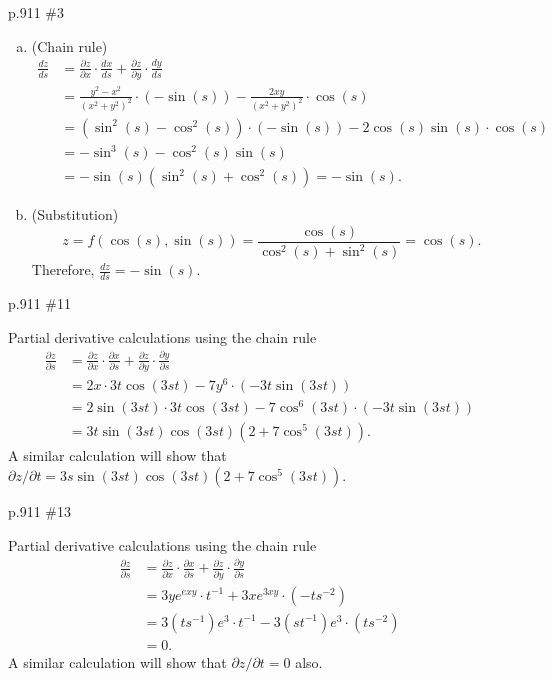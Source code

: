 \begin{practice}p.911 \#3\end{practice}
\begin{pracsol}
  \begin{enumerate}[(a)]
    \item (Chain rule)
    \[\begin{split}
      \frac{dz}{ds} &= \frac{\partial z}{\partial x}\cdot\frac{dx}{ds}+\frac{\partial z}{\partial y}\cdot\frac{dy}{ds}\\
      &= \frac{y^2-x^2}{(x^2+y^2)^2}\cdot(-\sin(s))-\frac{2xy}{(x^2+y^2)^2}\cdot\cos(s)\\
      &= (\sin^2(s)-\cos^2(s))\cdot(-\sin(s))-2\cos(s)\sin(s)\cdot\cos(s)\\
      &= -\sin^3(s)-\cos^2(s)\sin(s)\\
      &= -\sin(s)(\sin^2(s)+\cos^2(s))=-\sin(s).
    \end{split}\]

    \item (Substitution)
    \[z=f(\cos(s),\sin(s))=\frac{\cos(s)}{\cos^2(s)+\sin^2(s)}=\cos(s).\]
      Therefore, $\frac{dz}{ds}=-\sin(s)$.
  \end{enumerate}
\end{pracsol}

\begin{practice}p.911 \#11\end{practice}
\begin{pracsol}
  Partial derivative calculations using the chain rule
  \[\begin{split}
    \frac{\partial z}{\partial s} &= \frac{\partial z}{\partial x}\cdot\frac{\partial x}{\partial s}+\frac{\partial z}{\partial y}\cdot\frac{\partial y}{\partial s}\\
    &= 2x\cdot 3t\cos(3st)-7y^6\cdot(-3t\sin(3st))\\
    &= 2\sin(3st)\cdot 3t\cos(3st)-7\cos^6(3st)\cdot(-3t\sin(3st))\\
    &= 3t\sin(3st)\cos(3st)(2+7\cos^5(3st)).
  \end{split}\]
  A similar calculation will show that $\partial z/\partial t=3s\sin(3st)\cos(3st)(2+7\cos^5(3st))$.
\end{pracsol}

\begin{practice}p.911 \#13\end{practice}
\begin{pracsol}
  Partial derivative calculations using the chain rule
  \[\begin{split}
    \frac{\partial z}{\partial s} &= \frac{\partial z}{\partial x}\cdot\frac{\partial x}{\partial s}+\frac{\partial z}{\partial y}\cdot\frac{\partial y}{\partial s}\\
    &= 3ye^{exy}\cdot t^{-1}+3xe^{3xy}\cdot(-ts^{-2})\\
    &= 3(ts^{-1})e^3\cdot t^{-1}-3(st^{-1})e^3\cdot(ts^{-2})\\
    &= 0.
  \end{split}\]
  A similar calculation will show that $\partial z/\partial t=0$ also.
\end{pracsol}

